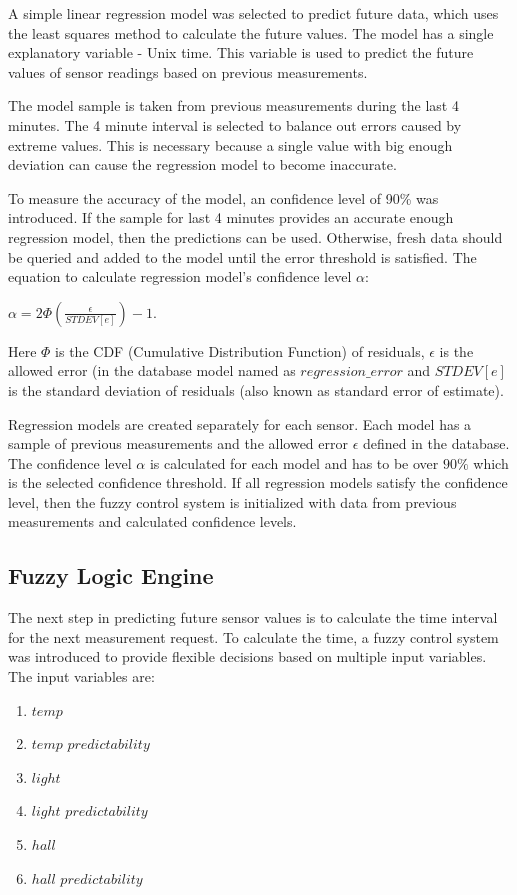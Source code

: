 A simple linear regression model was selected to predict future data, which uses the least squares method to calculate the future values.  The model has a single explanatory variable - Unix time. This variable is used to predict the future values of sensor readings based on previous measurements. 

The model sample is taken from previous measurements during the last 4 minutes. The 4 minute interval is selected to balance out errors caused by extreme values. This is necessary because a single value with big enough deviation can cause the regression model to become inaccurate. 

To measure the accuracy of the model, an confidence level of 90\% was introduced. If the sample for last 4 minutes provides an accurate enough regression model, then the predictions can be used. Otherwise, fresh data should be queried and added to the model until the error threshold is satisfied. The equation to calculate regression model's confidence level $\alpha$:\\

\begin{center}
$\alpha = 2\Phi \left ( \frac{\epsilon}{STDEV[e]}  \right ) - 1$.
\end{center}


Here $\Phi$ is the CDF (Cumulative Distribution Function) of residuals, $\epsilon$ is the allowed error (in the database model named as $regression\_error$ and $STDEV[e]$ is the standard deviation of residuals (also known as standard error of estimate). 

Regression models are created separately for each sensor. Each model has a sample of previous measurements and the allowed error $\epsilon$ defined in the database. 
The confidence level $\alpha$ is calculated for each model and has to be over $90\%$ which is the selected confidence threshold. If all regression models satisfy the confidence level, then the fuzzy control system is initialized with data from previous measurements and calculated confidence levels. 

\subsection{Fuzzy Logic Engine}

The next step in predicting future sensor values is to calculate the time interval for the next measurement request. To calculate the time, a fuzzy control system was introduced to provide flexible decisions based on multiple input variables. The input variables are: 
\begin{enumerate}
\item $temp$					
\item $temp$ $predictability$	
\item $light$					
\item $light$ $predictability$	
\item $hall$					
\item $hall$ $predictability$
\end{enumerate}

